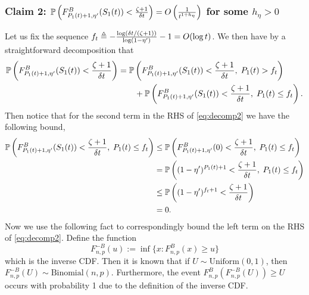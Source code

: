 \begin{myproof}[Proof.]
	\subsubsection*{Claim 2: $\mathbb{P}\left(F^B_{P_{1}(t)+1, \eta'}(S_1(t)) < \frac{\zeta + 1}{\delta t}\right) = O\left(\frac{1}{t^{1 + h_\eta}}\right)$ for some $h_\eta > 0$}
	Let us fix the sequence $f_t \triangleq -\frac{\log (\delta t/(\zeta+1)) }{\log (1-\eta')}-1 = O(\log t)$. We then have by a straightforward decomposition that
	\begin{align}
	\mathbb{P} \left( F^B_{P_{1}(t)+1, \eta'}(S_1(t)) < \frac{\zeta + 1}{\delta t} \right) & = \mathbb{P} \left( F^B_{P_{1}(t)+1, \eta'}(S_1(t)) < \frac{\zeta + 1}{\delta t}, \; P_{1}(t) > f_t \right)  \nonumber \\
	& \qquad + \mathbb{P} \left( F^B_{P_{1}(t)+1, \eta'}(S_1(t)) < \frac{\zeta + 1}{\delta t}, \; P_{1}(t) \le f_t \right) \label{eq:decomp2}.
	\end{align}
	Then notice that for the second term in the RHS of \eqref{eq:decomp2} we have the following bound,
	\begin{align}
	\mathbb{P} \left( F^B_{P_{1}(t)+1, \eta'}(S_1(t)) < \frac{\zeta + 1}{\delta t}, \; P_{1}(t) \le f_t \right)  &  \le \mathbb{P} \left( F^B_{P_{1}(t)+1,\eta'}(0) < \frac{\zeta + 1}{\delta  t}, \; P_{1}(t) \le f_t \right) \nonumber \\
	& = \mathbb{P} \left( (1-\eta')^{P_{1}(t)+1} <  \frac{\zeta + 1}{\delta  t}, \; P_{1}(t) \le f_t \right) \nonumber \\
	& \le \mathbb{P} \left( (1-\eta')^{f_t+1} <  \frac{\zeta + 1}{\delta  t} \right) \nonumber \\
	& = 0. \label{bound:bdd_by_zero}
	\end{align}
	Now we use the following fact to correspondingly bound the left term on the RHS of \eqref{eq:decomp2}. Define the function
	\[
	F^{-B}_{n,p}(u) := \inf\{x : F^B_{n,p}(x) \ge u\}
	\]
	which is the inverse CDF. Then it is known that if $U \sim \text{Uniform}(0,1)$, then $F^{-B}_{n,p}(U) \sim \text{Binomial}(n,p)$. Furthermore, the event $F^B_{n,p}(F^{-B}_{n,p}(U)) \ge U$ occurs with probability 1 due to the definition of the inverse CDF.
	

\end{myproof}
